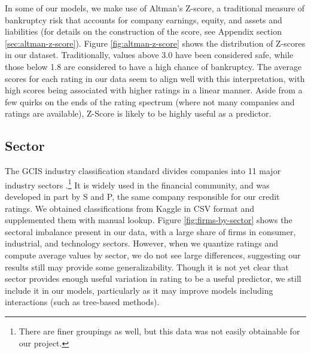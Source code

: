 \documentclass{article}[11pt]
\begin{document}
    In some of our models, we make use of Altman's Z-score, a traditional measure of bankruptcy risk that accounts for company earnings, equity, and assets and liabilities \citep{altman_financial_1968} (for details on the construction of the score, see Appendix section \ref{sec:altman-z-score}). Figure \ref{fig:altman-z-score} shows the distribution of Z-scores in our dataset. Traditionally, values above 3.0 have been considered safe, while those below 1.8 are considered to have a high chance of bankruptcy. The average scores for each rating in our data seem to align well with this interpretation, with high scores being associated with higher ratings in a linear manner. Aside from a few quirks on the ends of the rating spectrum (where not many companies and ratings are available), Z-Score is likely to be highly useful as a predictor.
      
    \subsection*{Sector}

    The GCIS industry classification standard divides companies into 11 major industry sectors \citep{s_and_p_gics_2024}.\footnote{There are finer groupings as well, but this data was not easily obtainable for our project.} It is widely used in the financial community, and was developed in part by S and P, the same company responsible for our credit ratings. We obtained classifications from Kaggle in CSV format \citep{kozlov_us_2022} and supplemented them with manual lookup. Figure \ref{fig:firms-by-sector} shows the sectoral imbalance present in our data, with a large share of firms in consumer, industrial, and technology sectors. However, when we quantize ratings and compute average values by sector, we do not see large differences, suggesting our results still may provide some generalizability. Though it is not yet clear that sector provides enough useful variation in rating to be a useful predictor, we still include it in our models, particularly as it may improve models including interactions (such as tree-based methods).
\end{document}
